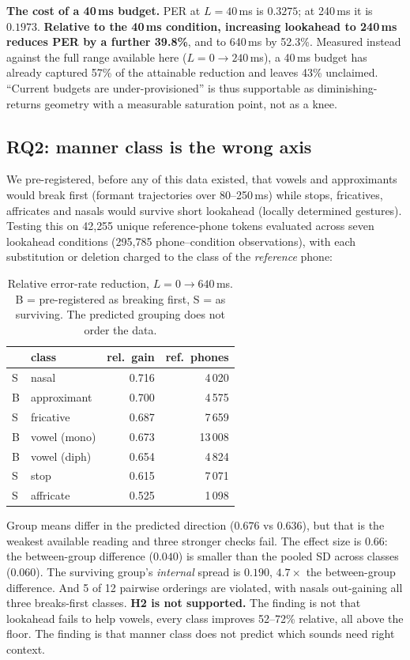 \documentclass{article}
\begin{document}
\textbf{The cost of a 40\,ms budget.} PER at $L{=}40$\,ms is $0.3275$; at
240\,ms it is $0.1973$. \textbf{Relative to the 40\,ms condition, increasing
lookahead to 240\,ms reduces PER by a further 39.8\%}, and to 640\,ms by
52.3\%. Measured instead against the full range available here
($L{=}0\rightarrow240$\,ms), a 40\,ms budget has already captured 57\% of the
attainable reduction and leaves 43\% unclaimed.
``Current budgets are under-provisioned'' is thus supportable as
diminishing-returns geometry with a measurable saturation point, not as a
knee.

\subsection{RQ2: manner class is the wrong axis}
\label{sec:rq2}

We pre-registered, before any of this data existed, that vowels and
approximants would break first (formant trajectories over 80--250\,ms) while
stops, fricatives, affricates and nasals would survive short lookahead (locally
determined gestures). Testing this on 42{,}255 unique reference-phone tokens evaluated across seven
lookahead conditions (295{,}785 phone--condition observations), with each
substitution or deletion charged to the class of the \emph{reference} phone:

\begin{table}[t]
\centering\small
\caption{Relative error-rate reduction, $L{=}0\rightarrow640$\,ms. B =
pre-registered as breaking first, S = as surviving. The predicted grouping does
not order the data.}
\label{tab:h2}
\begin{tabular}{llrr}
\toprule
& class & rel.\ gain & ref.\ phones \\
\midrule
S & nasal        & 0.716 & 4\,020 \\
B & approximant  & 0.700 & 4\,575 \\
S & fricative    & 0.687 & 7\,659 \\
B & vowel (mono) & 0.673 & 13\,008 \\
B & vowel (diph) & 0.654 & 4\,824 \\
S & stop         & 0.615 & 7\,071 \\
S & affricate    & 0.525 & 1\,098 \\
\bottomrule
\end{tabular}
\end{table}

Group means differ in the predicted direction ($0.676$ vs $0.636$), but that is
the weakest available reading and three stronger checks fail. The effect size
is $0.66$: the between-group difference ($0.040$) is smaller than the pooled SD
across classes ($0.060$). The surviving group's \emph{internal} spread is
$0.190$, $4.7\times$ the between-group difference. And 5 of 12 pairwise
orderings are violated, with nasals out-gaining all three breaks-first classes.
\textbf{H2 is not supported.} The finding is not that lookahead fails to help
vowels, every class improves 52--72\% relative, all above the floor. The
finding is that manner class does not predict which sounds need right context.
\end{document}
